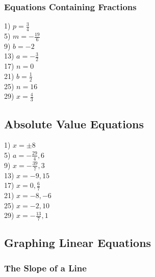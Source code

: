 \documentclass[11pt]{book}
\begin{document}
\subsubsection{Equations Containing Fractions}

\begin{multicols}{2}
1) $p=\frac{3}{4}$\\
5) $m=-\frac{19}{6}$\\
9) $b=-2$\\
13) $a=-\frac{3}{2}$\\
17) $n=0$\\
21) $b=\frac{1}{2}$\\
25) $n=16$\\
29) $x=\frac{4}{3}$
\end{multicols}

\newpage

\subsection*{Absolute Value Equations}

\begin{multicols}{2}
1) $x=\pm 8$\\
5) $a=-\frac{29}{4}, 6$\\
9) $x=-\frac{39}{7}, 3$\\
13) $x=-9, 15$\\
17) $x=0, \frac{6}{7}$\\
21) $x=-8, -6$\\
25) $x=-2, 10$\\
29) $x=-\frac{13}{7}, 1$
\end{multicols}

\subsection*{Graphing Linear Equations}



\subsubsection{The Slope of a Line}
\end{document}
